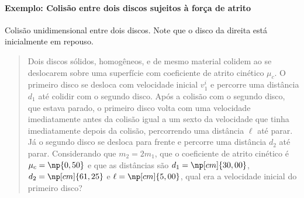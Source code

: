 \paragraph{Exemplo: Colisão entre dois discos sujeitos à força de atrito}

\begin{marginfigure}[4cm]
\centering
{}
\caption{Colisão unidimensional entre dois discos. Note que o disco da direita está inicialmente em repouso.}
\end{marginfigure}

\begin{quote}
Dois discos sólidos, homogêneos, e de mesmo material colidem ao se deslocarem sobre uma superfície com coeficiente de atrito cinético $\mu_c$. O primeiro disco se desloca com velocidade inicial $v_1^i$ e percorre uma distância $d_1$ até colidir com o segundo disco. Após a colisão com o segundo disco, que estava parado, o primeiro disco volta com uma velocidade imediatamente antes da colisão igual a um sexto da velocidade que tinha imediatamente depois da colisão, percorrendo uma distância $\ell$ até parar. Já o segundo disco se desloca para frente e percorre uma distância $d_2$ até parar. Considerando que $m_2 = 2 m_1$, que o coeficiente de atrito cinético é $\mu_c = \np{0,50}$ e que as distâncias são $d_1 = \np[cm]{30,00}$, $d_2 = \np[cm]{61,25}$ e $\ell = \np[cm]{5,00}$, qual era a velocidade inicial do primeiro disco?
\end{quote}

